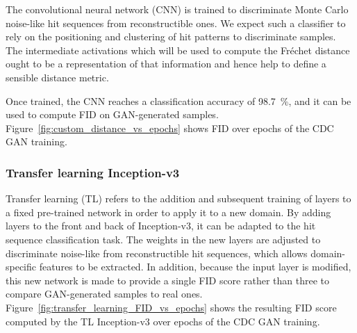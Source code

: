 The convolutional neural network (CNN) is trained to discriminate Monte Carlo
noise-like hit sequences from reconstructible ones. We expect such a classifier
to rely on the positioning and clustering of hit patterns to discriminate
samples. The intermediate activations which will be used to compute the Fréchet
distance ought to be a representation of that information and hence help to
define a sensible distance metric.

Once trained, the CNN reaches a classification accuracy of \SI{98.7}{\percent},
and it can be used to compute FID on GAN-generated samples.
Figure~\ref{fig:custom_distance_vs_epochs} shows FID over epochs of the CDC GAN
training.


\subsubsection{Transfer learning Inception-v3}

Transfer learning (TL) refers to the addition and subsequent training of layers
to a fixed pre-trained network in order to apply it to a new domain. By adding
layers to the front and back of Inception-v3, it can be adapted to the hit
sequence classification task. The weights in the new layers are adjusted to
discriminate noise-like from reconstructible hit sequences, which allows
domain-specific features to be extracted. In addition, because the input layer
is modified, this new network is made to provide a single FID score rather than
three to compare GAN-generated samples to real ones.
Figure~\ref{fig:transfer_learning_FID_vs_epochs} shows the resulting FID score
computed by the TL Inception-v3 over epochs of the CDC GAN training.

